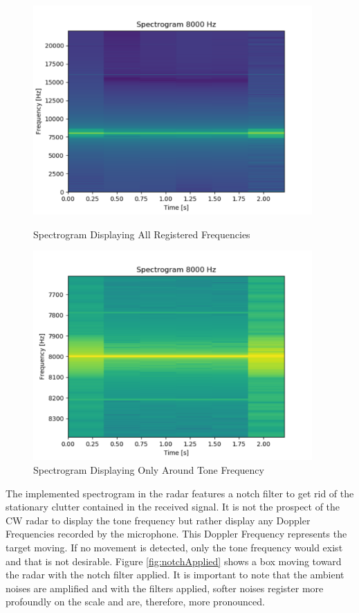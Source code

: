\begin{figure}[h!]
    \centering
    \begin{minipage}{0.45\textwidth}
        \centering
        \includegraphics[width=0.95\textwidth]{images/cwSpec.pdf}
        \caption{Spectrogram Displaying All Registered Frequencies}\label{fig:cwSpec}
    \end{minipage}\hfill
    \begin{minipage}{0.45\textwidth}
        \centering
        \includegraphics[width = 0.95\textwidth]{images/cwSpec1.pdf}
        \caption{Spectrogram Displaying Only Around Tone Frequency}\label{fig:cwSpec1}
    \end{minipage}
\end{figure}
The implemented spectrogram in the radar features a notch filter to get rid of the stationary clutter contained in the received signal. It is not the prospect of the CW radar to display the tone frequency but rather display any Doppler Frequencies recorded by the microphone. This Doppler Frequency represents the target moving. If no movement is detected, only the tone frequency would exist and that is not desirable. Figure \ref{fig:notchApplied} shows a box moving toward the radar with the notch filter applied. It is important to note that the ambient noises are amplified and with the filters applied, softer noises register more profoundly on the scale and are, therefore, more pronounced.

